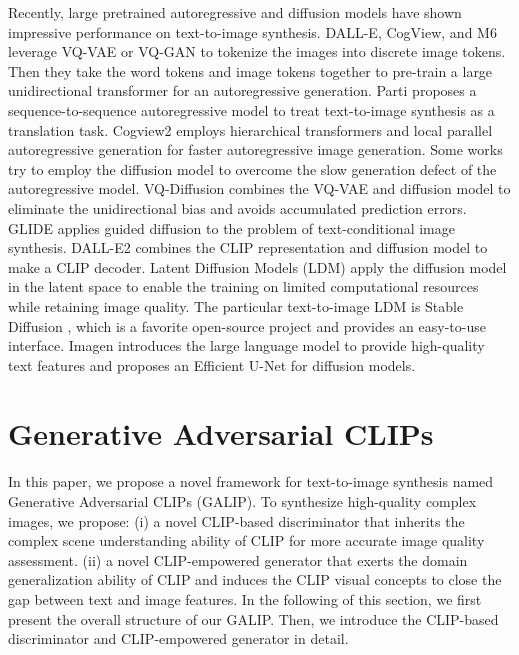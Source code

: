 \documentclass[10pt,twocolumn,letterpaper]{article}
\begin{document}
Recently, large pretrained autoregressive and diffusion models have shown impressive performance on text-to-image synthesis.
DALL-E\cite{ramesh2021zero}, CogView\cite{ding2021cogview}, and M6 \cite{lin2021m6} leverage VQ-VAE \cite{van2017neural} or VQ-GAN \cite{esser2021taming} to tokenize the images into discrete image tokens.
Then they take the word tokens and image tokens together to pre-train a large unidirectional transformer for an autoregressive generation.
Parti \cite{yu2022scaling} proposes a sequence-to-sequence autoregressive model to treat text-to-image synthesis as a translation task.
Cogview2 \cite{ding2022cogview2} employs hierarchical transformers and local parallel autoregressive generation for faster autoregressive image generation.
Some works try to employ the diffusion model \cite{sohl2015deep,dhariwal2021diffusion,ho2020denoising,ho2022cascaded,nichol2021improved} to overcome the slow generation defect of the autoregressive model.
VQ-Diffusion \cite{gu2022vector} combines the VQ-VAE \cite{van2017neural} and diffusion model \cite{ho2022cascaded,nichol2021improved} to eliminate the unidirectional bias and avoids accumulated prediction errors.
GLIDE \cite{nichol2021glide} applies guided diffusion to the problem of text-conditional image synthesis.
DALL-E2 \cite{ramesh2022hierarchical} combines the CLIP representation and diffusion model to make a CLIP decoder.
Latent Diffusion Models (LDM) \cite{rombach2022high} apply the diffusion model in the latent space to enable the training on limited computational resources while retaining image quality.
The particular text-to-image LDM is Stable Diffusion \cite{stablediff}, which is a favorite open-source project and provides an easy-to-use interface.
Imagen \cite{saharia2022photorealistic} introduces the large language model \cite{raffel2020exploring} to provide high-quality text features and proposes an Efficient U-Net for diffusion models.



\section{Generative Adversarial CLIPs }

In this paper, we propose a novel framework for text-to-image synthesis named Generative Adversarial CLIPs (GALIP). 
To synthesize high-quality complex images, we propose: 
(i) a novel CLIP-based discriminator that inherits the complex scene understanding ability of CLIP \cite{radford2021learning} for more accurate image quality assessment.
(ii) a novel CLIP-empowered generator that exerts the domain generalization ability of CLIP \cite{radford2021learning} and induces the CLIP visual concepts to close the gap between text and image features.
In the following of this section, we first present the overall structure of our GALIP. 
Then, we introduce the CLIP-based discriminator and CLIP-empowered generator in detail.
\end{document}
